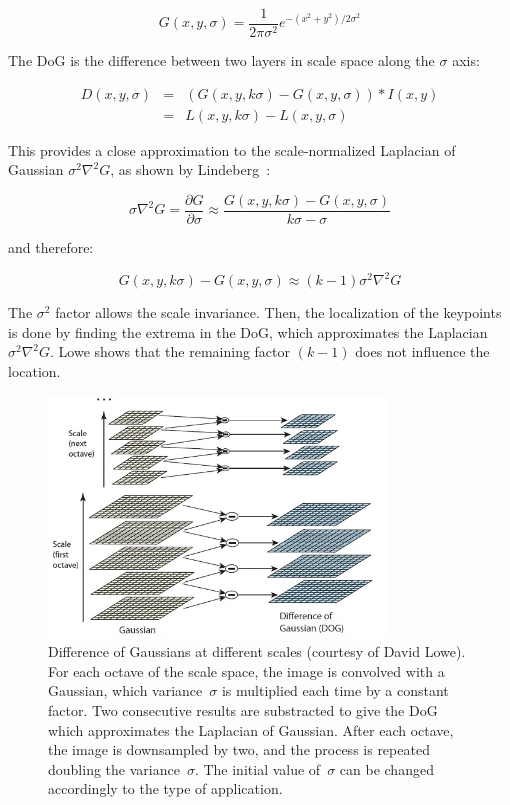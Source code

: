 \[ G(x,y,\sigma) = \frac{1}{2\pi\sigma^2}e^{-{(x^2+y^2)/2\sigma^2}} \]


The \gls{DoG} is the difference between two layers in scale space along the $\sigma$ axis:

\[
\begin{array}{rcl}
D(x,y,\sigma) & = & (G(x,y, k\sigma) - G(x,y,\sigma)) * I(x,y) \\
 & = & L(x,y,k\sigma) - L(x,y,\sigma)
\end{array}
\] 

This provides a close approximation to the scale-normalized Laplacian of Gaussian $\sigma^2\nabla^2G$, as shown by Lindeberg~\cite{Lindeberg_1994}:

\[ \sigma\nabla^2G = \frac{\partial G}{\partial \sigma} \approx \frac{G(x,y,k\sigma)-G(x,y,\sigma)}{k\sigma - \sigma} \]

and therefore:

\[ G(x,y,k\sigma) - G(x,y,\sigma) \approx (k-1)\sigma^2\nabla^2G \]

The $\sigma^2$ factor allows the scale invariance. Then, the localization of the keypoints is done by finding the extrema in the \gls{DoG}, which approximates the Laplacian~$\sigma^2\nabla^2G$. Lowe shows that the remaining factor $(k-1)$ does not influence the location. 

\begin{figure}[h]
\centering
\includegraphics[width=0.8\textwidth]{figures/sift_dog}
\caption{Difference of Gaussians at different scales (courtesy of David Lowe). For each octave of the scale space, the image is convolved with a Gaussian, which variance~$\sigma$ is multiplied each time by a constant factor. Two consecutive results are substracted to give the DoG which approximates the Laplacian of Gaussian. After each octave, the image is downsampled by two, and the process is repeated doubling the variance~$\sigma$. The initial value of~$\sigma$ can be changed accordingly to the type of application. }
\label{fig:sift_dog}
\end{figure}

